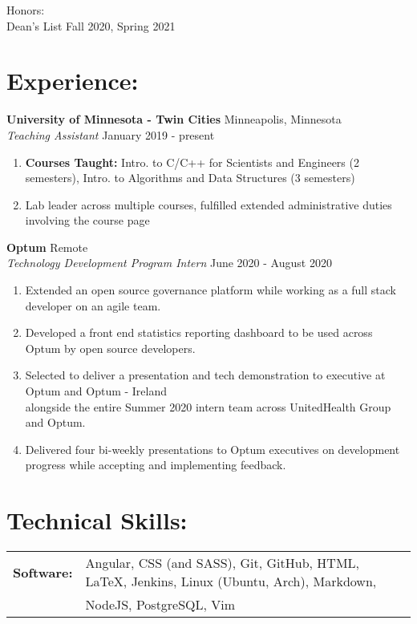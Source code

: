 \documentclass[10pt]{article}
\begin{document}
		\vspace{5pt}
		\indent 
		{Honors: }\\
		\indent \indent
		{Dean's List} \hfill Fall 2020, Spring 2021
			
	\section*{Experience: \hrulefill}
		\textbf{University of Minnesota - Twin Cities} \hfill Minneapolis, Minnesota \\
		\textit{Teaching Assistant} \hfill January 2019 - present 
		\begin{enumerate}[label=--]
			\item \textbf{Courses Taught:} {Intro. to C/C++ for Scientists and Engineers} (2 semesters), {Intro. to Algorithms and Data Structures} (3 semesters)
			\item Lab leader across multiple courses, fulfilled extended administrative duties involving the course page
		\end{enumerate}
		
		\noindent
		\textbf{Optum} \hfill Remote \\
		\textit{Technology Development Program Intern} \hfill June 2020 - August 2020
		\begin{enumerate}[label=--]
			\item Extended an open source governance platform while working as a full stack developer on an agile team.
			\item Developed a front end statistics reporting dashboard to be used across Optum by open source developers.
			\item Selected to deliver a presentation and tech demonstration to executive at Optum and Optum - Ireland \\ alongside the entire Summer 2020 intern team across UnitedHealth Group and Optum.
			\item Delivered four bi-weekly presentations to Optum executives on development progress while accepting and implementing feedback.
		\end{enumerate}
		
	\section*{Technical Skills: \hrulefill}
		\begin{tabular}{@{}l@{\ }l}
		\textbf{Software: } & Angular, CSS (and SASS), Git, GitHub, HTML, {\large \LaTeX}, Jenkins, Linux (Ubuntu, Arch), Markdown,\\ & NodeJS, PostgreSQL, Vim
		\end{tabular}
		
\end{document}
